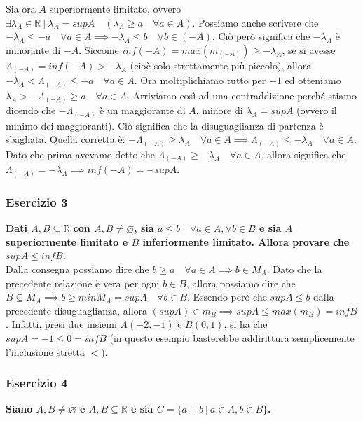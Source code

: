 \documentclass{article}
\begin{document}
\noindent Sia ora $A$ superiormente limitato, ovvero $\exists \lambda_A \in \mathbb{R} \ | \ \lambda_A = supA \quad (\lambda_A \geq a \quad \forall a \in A)$. Possiamo anche scrivere che $-\lambda_A \leq -a \quad \forall a \in A \implies -\lambda_A \leq b \quad \forall b \in (-A)$. Ciò però significa che $-\lambda_A$ è minorante di $-A$. Siccome $inf(-A) = max(m_{(-A)}) \geq -\lambda_A$, se si avesse $\Lambda_{(-A)} = inf(-A) > -\lambda_A$ (cioè solo strettamente più piccolo), allora $- \lambda_A < \Lambda_{(-A)} \leq -a \quad \forall a \in A$. Ora moltiplichiamo tutto per $-1$ ed otteniamo $\lambda_A > - \Lambda_{(-A)} \geq a \quad \forall a \in A$. Arriviamo così ad una contraddizione perché stiamo dicendo che $-\Lambda_{(-A)}$ è un maggiorante di $A$, minore di $\lambda_A = supA$ (ovvero il minimo dei maggioranti). Ciò significa che la disuguaglianza di partenza è sbagliata. Quella corretta è: $- \Lambda_{(-A)} \geq \lambda_A \quad \forall a \in A \implies \Lambda_{(-A)} \leq - \lambda_A \quad \forall a \in A$. Dato che prima avevamo detto che $\Lambda_{(-A)} \geq - \lambda_A \quad \forall a \in A$, allora significa che $\Lambda_{(-A)} = - \lambda_A \implies inf(-A) = -supA$.

\subsubsection{Esercizio 3}
\textbf{Dati $A, B \subseteq \mathbb{R}$ con $ A, B \neq \varnothing$, sia $a \leq b \quad \forall a \in A, \forall b \in B$ e sia $A$ superiormente limitato e $B$ inferiormente limitato. Allora provare che $supA \leq infB$.}\\

\noindent Dalla consegna possiamo dire che $b \geq a \quad \forall a \in A \implies b \in M_A$. Dato che la precedente relazione è vera per ogni $b \in B$, allora possiamo dire che $B \subseteq M_A \implies b \geq minM_A = supA \quad \forall b \in B$. Essendo però che $supA \leq b$ dalla precedente disuguaglianza, allora $(supA) \in m_B \implies supA \leq max(m_B) = infB$. Infatti, presi due insiemi $A(-2, -1)$ e $B(0,1)$, si ha che $supA = -1 \leq 0 = infB$ (in questo esempio basterebbe addirittura semplicemente l'inclusione stretta $<$).

\subsubsection{Esercizio 4}
\textbf{Siano $A,B \neq \varnothing$ e $A, B \subseteq \mathbb{R}$ e sia $C = \{ a + b \ | \ a \in A, b \in B \}$.} \\
\end{document}
